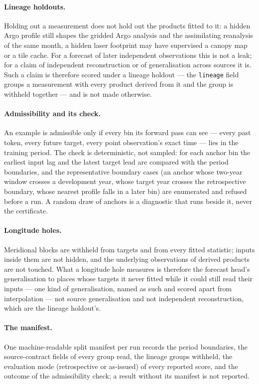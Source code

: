 \documentclass[10pt]{article}
\newcommand{\code}[1]{\texttt{#1}}
\begin{document}
\paragraph{Lineage holdouts.} Holding out a measurement does not hold out
the products fitted to it: a hidden Argo profile still shapes the gridded
Argo analysis and the assimilating reanalysis of the same month, a hidden
laser footprint may have supervised a canopy map or a tile cache. For a
forecast of later independent observations this is not a leak; for a claim
of independent reconstruction or of generalisation across sources it is.
Such a claim is therefore scored under a lineage holdout --- the
\code{lineage} field groups a measurement with every product derived from it
and the group is withheld together --- and is not made otherwise.

\paragraph{Admissibility and its check.} An example is admissible only if
every bin its forward pass can see --- every past token, every future
target, every point observation's exact time --- lies in the training
period. The check is deterministic, not sampled: for each anchor bin the
earliest input lag and the latest target lead are compared with the period
boundaries, and the representative boundary cases (an anchor whose two-year
window crosses a development year, whose target year crosses the
retrospective boundary, whose nearest profile falls in a later bin) are
enumerated and refused before a run. A random draw of anchors is a
diagnostic that runs beside it, never the certificate.

\paragraph{Longitude holes.} Meridional blocks are withheld from targets and
from every fitted statistic; inputs inside them are not hidden, and the
underlying observations of derived products are not touched. What a
longitude hole measures is therefore the forecast head's generalisation to
places whose targets it never fitted while it could still read their
inputs --- one kind of generalisation, named as such and scored apart from
interpolation --- not source generalisation and not independent
reconstruction, which are the lineage holdout's.

\paragraph{The manifest.} One machine-readable split manifest per run
records the period boundaries, the source-contract fields of every group
read, the lineage groups withheld, the evaluation mode (retrospective or
as-issued) of every reported score, and the outcome of the admissibility
check; a result without its manifest is not reported.
\end{document}
